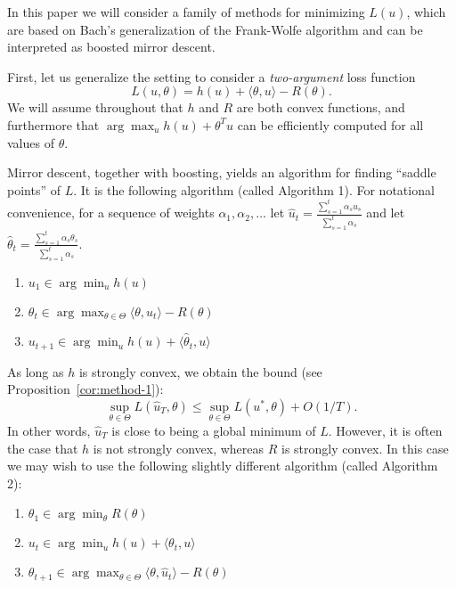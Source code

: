 \documentclass{article}
\begin{document}
In this paper we will consider a family of methods for minimizing $L(u)$, 
which are based on Bach's generalization of the Frank-Wolfe algorithm and can 
be interpreted as boosted mirror descent.

First, let us generalize the setting 
to consider a \emph{two-argument} loss function
\begin{equation}
L(u,\theta) = h(u) + \langle \theta, u \rangle - R(\theta).
\end{equation}
We will assume throughout that $h$ and $R$ are both convex functions, 
and furthermore that $\arg\max_{u} h(u) + \theta^Tu$ can be efficiently 
computed for all values of $\theta$.

Mirror descent, together with boosting, yields an algorithm for finding 
``saddle points'' of $L$. It is the following algorithm (called Algorithm 1).
For notational convenience, for a sequence of weights $\alpha_1,\alpha_2,\ldots$ 
let $\hat{u}_t = \frac{\sum_{s=1}^t \alpha_su_s}{\sum_{s=1}^t \alpha_s}$ and let 
$\hat{\theta}_t = \frac{\sum_{s=1}^t \alpha_s\theta_s}{\sum_{s=1}^t \alpha_s}$.
\begin{enumerate}
\item $u_1 \in \arg\min_u h(u)$
\item $\theta_{t} \in \arg\max_{\theta \in \Theta} \langle \theta, u_t \rangle - R(\theta)$
\item $u_{t+1} \in \arg\min_{u} h(u) + \langle \hat{\theta}_t, u \rangle$
\end{enumerate}
As long as $h$ is strongly convex, we obtain the 
bound (see Proposition~\ref{cor:method-1}):
\begin{equation}
\sup_{\theta \in \Theta} L(\hat{u}_T, \theta) \leq \sup_{\theta \in \Theta} L(u^*, \theta) + O(1/T).
\end{equation}
In other words, $\hat{u}_T$ is close to being a global minimum of $L$.
However, it is often the case that $h$ is not strongly convex, whereas $R$ is strongly convex. In this case 
we may wish to use the following slightly different algorithm (called Algorithm 2):
\begin{enumerate}
\item $\theta_1 \in \arg\min_{\theta} R(\theta)$
\item $u_t \in \arg\min_{u} h(u) + \langle \theta_t, u \rangle$
\item $\theta_{t+1} \in \arg\max_{\theta \in \Theta} \langle \theta, \hat{u}_t \rangle - R(\theta)$
\end{enumerate}
\end{document}
